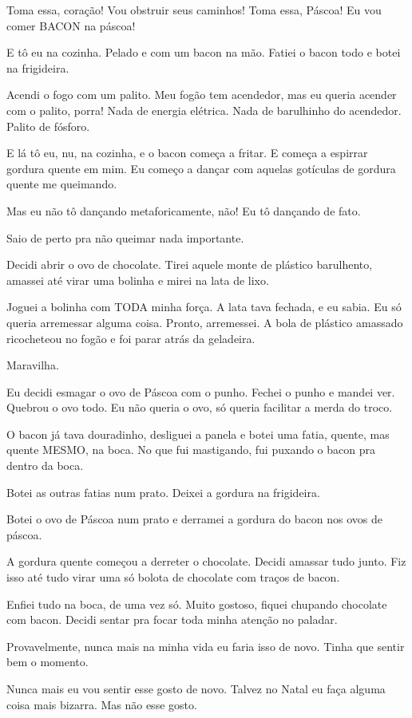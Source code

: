 Toma essa, coração! Vou obstruir seus caminhos! Toma essa, Páscoa! Eu vou comer BACON na páscoa!

E tô eu na cozinha. Pelado e com um bacon na mão. Fatiei o bacon todo e botei na frigideira.

Acendi o fogo com um palito. Meu fogão tem acendedor, mas eu queria acender com o palito, porra! Nada de energia elétrica. Nada de barulhinho do acendedor. Palito de fósforo.

E lá tô eu, nu, na cozinha, e o bacon começa a fritar. E começa a espirrar gordura quente em mim. Eu começo a dançar com aquelas gotículas de gordura quente me queimando.

Mas eu não tô dançando metaforicamente, não! Eu tô dançando de fato.

Saio de perto pra não queimar nada importante.

Decidi abrir o ovo de chocolate. Tirei aquele monte de plástico barulhento, amassei até virar uma bolinha e mirei na lata de lixo.

Joguei a bolinha com TODA minha força. A lata tava fechada, e eu sabia. Eu só queria arremessar alguma coisa. Pronto, arremessei. A bola de plástico amassado ricocheteou no fogão e foi parar atrás da geladeira.

Maravilha.

Eu decidi esmagar o ovo de Páscoa com o punho. Fechei o punho e mandei ver. Quebrou o ovo todo. Eu não queria o ovo, só queria facilitar a merda do troco.

O bacon já tava douradinho, desliguei a panela e botei uma fatia, quente, mas quente MESMO, na boca. No que fui mastigando, fui puxando o bacon pra dentro da boca.

Botei as outras fatias num prato. Deixei a gordura na frigideira.

Botei o ovo de Páscoa num prato e derramei a gordura do bacon nos ovos de páscoa.

A gordura quente começou a derreter o chocolate. Decidi amassar tudo junto. Fiz isso até tudo virar uma só bolota de chocolate com traços de bacon.

Enfiei tudo na boca, de uma vez só. Muito gostoso, fiquei chupando chocolate com bacon. Decidi sentar pra focar toda minha atenção no paladar.

Provavelmente, nunca mais na minha vida eu faria isso de novo. Tinha que sentir bem o momento.

Nunca mais eu vou sentir esse gosto de novo. Talvez no Natal eu faça alguma coisa mais bizarra. Mas não esse gosto.

